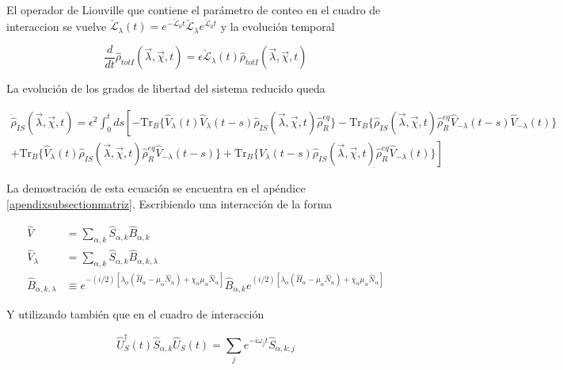 El operador de Liouville que contiene el parámetro de conteo en el cuadro de interaccion se vuelve $\check{\mathcal{L}}_{\lambda}(t) = e^{-\check{\mathcal{L}}_{0}t}\check{\mathcal{L}}_{\lambda}e^{\check{\mathcal{L}}_{0}t}$ y la evolución temporal

\begin{equation}
    \frac{d}{dt}\hat{\rho}_{totI}(\vec{\lambda},\vec{\chi},t) = \epsilon \check{\mathcal{L}}_{\lambda}(t)\hat{\rho}_{totI}(\vec{\lambda},\vec{\chi},t)
 \label{sec2FCS:evolution}
\end{equation}

La evolución de los grados de libertad del sistema reducido queda 

\begin{multline}
    \dot{\hat{\rho}}_{IS}(\vec{\lambda},\vec{\chi},t) =  \epsilon^{2}\int_{0}^{t}ds \left[- \text{Tr}_{B}\{\hat{V}_{\lambda}(t)\hat{V}_{\lambda}(t-s)\hat{\rho}_{IS}(\vec{\lambda},\vec{\chi},t)\hat{\rho}^{eq}_{R} \} - \text{Tr}_{B}\{\hat{\rho}_{IS}(\vec{\lambda},\vec{\chi},t)\hat{\rho}^{eq}_{R}\hat{V}_{-\lambda}(t-s)\hat{V}_{-\lambda}(t) \} \right.\\
    \left. + \text{Tr}_{B}\{\hat{V}_{\lambda}(t)\hat{\rho}_{IS}(\vec{\lambda},\vec{\chi},t)\hat{\rho}^{eq}_{R}\hat{V}_{-\lambda}(t-s) \} + \text{Tr}_{B}\{ \hat{V}_{\lambda}(t-s)\hat{\rho}_{IS}(\vec{\lambda},\vec{\chi},t)\hat{\rho}^{eq}_{R}\hat{V}_{-\lambda}(t) \}  \right]
\label{ecmaestraVlambda}
\end{multline}

La demostración de esta ecuación se encuentra en el apéndice \ref{apendixsubsectionmatriz}. Escribiendo una interacción de la forma

\begin{align*}
    \hat{V} & = \sum_{\alpha,k}\hat{S}_{\alpha,k}\hat{B}_{\alpha,k} \\
    \hat{V}_{\lambda} & = \sum_{\alpha,k}\hat{S}_{\alpha,k}\hat{B}_{\alpha,k,\lambda} \\
    \hat{B}_{\alpha,k,\lambda} & \equiv e^{-(i/2)[\lambda_{\alpha}(\hat{H}_{\alpha} - \mu_{\alpha}\hat{N}_{\alpha}) + \chi_{\alpha}\mu_{\alpha}\hat{N}_{\alpha}]}\hat{B}_{\alpha,k}e^{(i/2)[\lambda_{\alpha}(\hat{H}_{\alpha} - \mu_{\alpha}\hat{N}_{\alpha}) + \chi_{\alpha}\mu_{\alpha}\hat{N}_{\alpha}]}   
\end{align*}

Y utilizando también que en el cuadro de interacción

\begin{equation*}
    \hat{U}^{\dagger}_{S}(t)\hat{S}_{\alpha,k}\hat{U}_{S}(t) = \sum_{j}e^{-i\omega_{j}t}\hat{S}_{\alpha,k;j}
\end{equation*}

